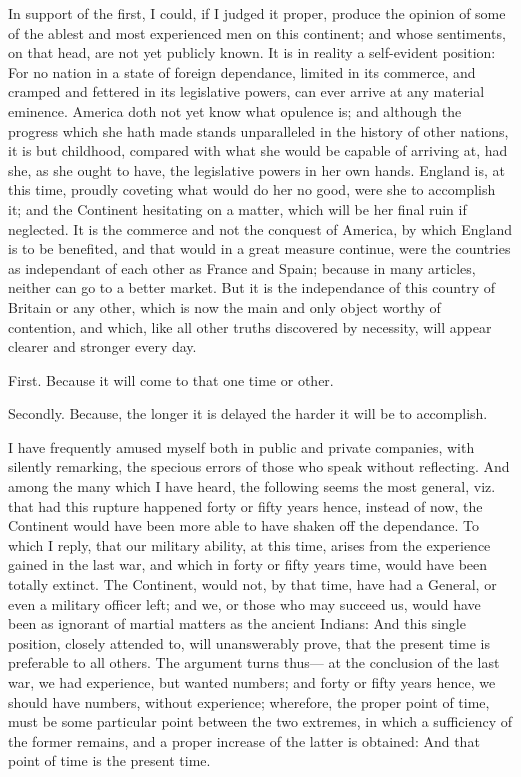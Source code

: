 \documentclass[12pt,oneside]{memoir}
\begin{document}
In support of the first, I could, if I judged it proper, produce the opinion of some of the ablest and most experienced men on this continent; and whose sentiments, on that head, are not yet publicly known. It is in reality a self-evident position: For no nation in a state of foreign dependance, limited in its commerce, and cramped and fettered in its legislative powers, can ever arrive at any material eminence. America doth not yet know what opulence is; and although the progress which she hath made stands unparalleled in the history of other nations, it is but childhood, compared with what she would be capable of arriving at, had she, as she ought to have, the legislative powers in her own hands. England is, at this time, proudly coveting what would do her no good, were she to accomplish it; and the Continent hesitating on a matter, which will be her final ruin if neglected. It is the commerce and not the conquest of America, by which England is to be benefited, and that would in a great measure continue, were the countries as independant of each other as France and Spain; because in many articles, neither can go to a better market. But it is the independance of this country of Britain or any other, which is now the main and only object worthy of contention, and which, like all other truths discovered by necessity, will appear clearer and stronger every day.

First. Because it will come to that one time or other.

Secondly. Because, the longer it is delayed the harder it will be to accomplish.

I have frequently amused myself both in public and private companies, with silently remarking, the specious errors of those who speak without reflecting. And among the many which I have heard, the following seems the most general, viz. that had this rupture happened forty or fifty years hence, instead of now, the Continent would have been more able to have shaken off the dependance. To which I reply, that our military ability, at this time, arises from the experience gained in the last war, and which in forty or fifty years time, would have been totally extinct. The Continent, would not, by that time, have had a General, or even a military officer left; and we, or those who may succeed us, would have been as ignorant of martial matters as the ancient Indians: And this single position, closely attended to, will unanswerably prove, that the present time is preferable to all others. The argument turns thus--- at the conclusion of the last war, we had experience, but wanted numbers; and forty or fifty years hence, we should have numbers, without experience; wherefore, the proper point of time, must be some particular point between the two extremes, in which a sufficiency of the former remains, and a proper increase of the latter is obtained: And that point of time is the present time.
\end{document}
